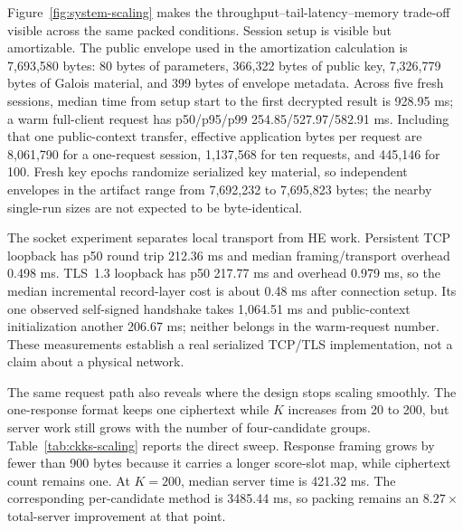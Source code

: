 \documentclass[pdflatex,sn-basic,Numbered]{sn-jnl}
\theoremstyle{plain}
\begin{document}
Figure~\ref{fig:system-scaling} makes the throughput--tail-latency--memory trade-off visible across the same packed conditions. Session setup is visible but amortizable. The public envelope used in the amortization calculation is 7,693,580 bytes: 80 bytes of parameters, 366,322 bytes of public key, 7,326,779 bytes of Galois material, and 399 bytes of envelope metadata. Across five fresh sessions, median time from setup start to the first decrypted result is 928.95 ms; a warm full-client request has p50/p95/p99 254.85/527.97/582.91 ms. Including that one public-context transfer, effective application bytes per request are 8,061,790 for a one-request session, 1,137,568 for ten requests, and 445,146 for 100. Fresh key epochs randomize serialized key material, so independent envelopes in the artifact range from 7,692,232 to 7,695,823 bytes; the nearby single-run sizes are not expected to be byte-identical.

The socket experiment separates local transport from HE work. Persistent TCP loopback has p50 round trip 212.36 ms and median framing/transport overhead 0.498 ms. TLS~1.3 loopback has p50 217.77 ms and overhead 0.979 ms, so the median incremental record-layer cost is about 0.48 ms after connection setup. Its one observed self-signed handshake takes 1,064.51 ms and public-context initialization another 206.67 ms; neither belongs in the warm-request number. These measurements establish a real serialized TCP/TLS implementation, not a claim about a physical network.

The same request path also reveals where the design stops scaling smoothly.\label{subsec:scaling-results} The one-response format keeps one ciphertext while $K$ increases from 20 to 200, but server work still grows with the number of four-candidate groups. Table~\ref{tab:ckks-scaling} reports the direct sweep. Response framing grows by fewer than 900 bytes because it carries a longer score-slot map, while ciphertext count remains one. At $K=200$, median server time is 421.32 ms. The corresponding per-candidate method is 3485.44 ms, so packing remains an $8.27\times$ total-server improvement at that point.
\end{document}
